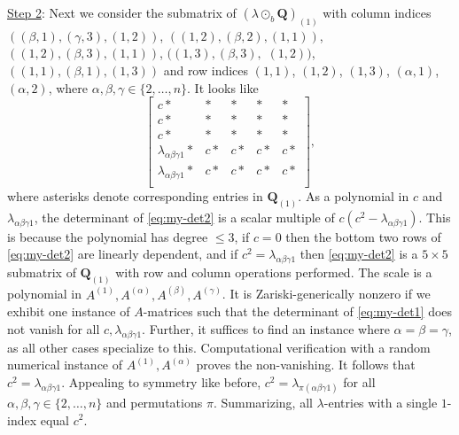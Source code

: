 \documentclass[11pt]{amsart}
\begin{document}
\medskip 

\underline{Step 2}:  
Next we consider the submatrix of $(\lambda \odot_b \mathbf{Q})_{(1)}$ with column indices  
$((\beta,1),(\gamma,3),(1,2))$, 
$((1,2),(\beta,2),(1,1))$,
$((1,2),(\beta,3),(1,1))$,
$((1,3),(\beta,3),$ $(1,2))$,
$((1,1),(\beta,1),(1,3))$
and row indices 
$(1,1)$,
$(1,2)$,
$(1,3)$,
$(\alpha,1)$,
$(\alpha,2)$, 
where $\alpha, \beta, \gamma \in \{2, \ldots, n\}$.
It looks like 
\begin{equation} \label{eq:my-det2}
\begin{bmatrix}
c\ast & \ast & \ast & \ast & \ast \\
c\ast & \ast & \ast & \ast & \ast \\
c\ast & \ast & \ast & \ast & \ast \\
\lambda_{\alpha \beta \gamma 1}\ast & c\ast & c\ast & c\ast & c\ast \\
\lambda_{\alpha \beta \gamma 1}\ast & c\ast & c\ast & c\ast & c\ast \\
\end{bmatrix},
\end{equation}
where asterisks denote corresponding entries in $\mathbf{Q}_{(1)}$.
As a polynomial in $c$ and $\lambda_{\alpha \beta \gamma 1}$, the determinant of \eqref{eq:my-det2} is a scalar multiple of $c(c^2 - \lambda_{\alpha \beta \gamma 1})$.
This is because the polynomial has degree $\leq 3$, if $c=0$ then the bottom two rows of \eqref{eq:my-det2} are linearly dependent, and if $c^2 = \lambda_{\alpha \beta \gamma 1}$ then \eqref{eq:my-det2} is a $5 \times 5$ submatrix of $\mathbf{Q}_{(1)}$ with row and column operations performed.  
The scale is a polynomial in $A^{(1)}, A^{(\alpha)}, A^{(\beta)}, A^{(\gamma)}$.
It is Zariski-generically nonzero if we exhibit one instance of $A$-matrices such that the determinant of \eqref{eq:my-det1} does not vanish for all $c, \lambda_{\alpha \beta \gamma 1}$.
Further, it suffices to find an instance where $\alpha = \beta = \gamma$, as all other cases specialize to this.  Computational verification with a random numerical instance of $A^{(1)}, A^{(\alpha)}$ proves the non-vanishing.  
It follows that $c^2 = \lambda_{\alpha \beta \gamma 1}$. 
Appealing to symmetry like before, 
$
c^2 = \lambda_{\pi(\alpha \beta \gamma 1)}
$
for all $\alpha, \beta, \gamma \in \{2, \dots, n\}$ and permutations $\pi$.  
Summarizing, all $\lambda$-entries with a single $1$-index equal $c^2$.

\medskip
\end{document}
